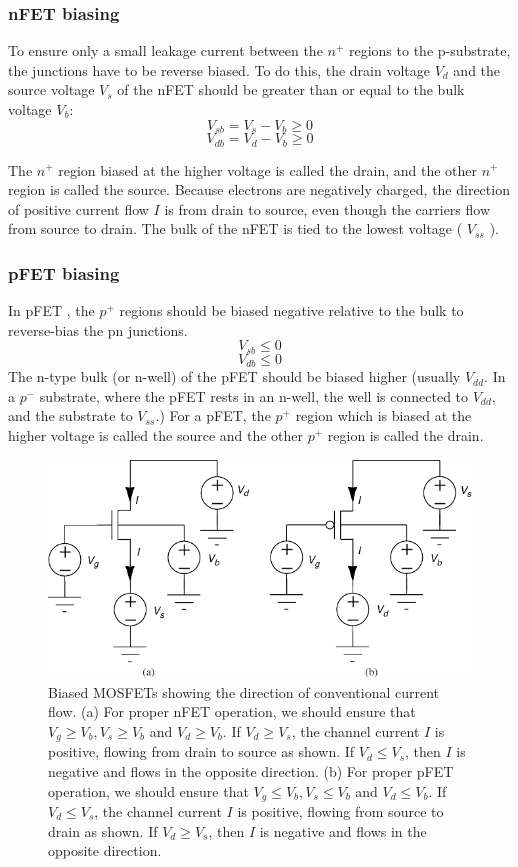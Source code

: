 \documentclass[main]{subfiles}
\begin{document}
\subsubsection{nFET biasing}
To ensure only a small leakage current between the $n^+$ regions to the p-substrate, the junctions have to be reverse biased.
To do this, the drain voltage $V_d$ and the source voltage $V_s$ of the nFET should be greater than or equal to the bulk voltage $V_b$:
\[V_{sb}=V_s-V_b \geq 0\]
\[V_{db}=V_d-V_b \geq 0\]


The $n^+$ region biased at the higher voltage is called the drain, and the other $n^+$ region is called the source. Because electrons are negatively charged, the direction of positive current flow $I$ is from drain to source, even though the carriers flow from source to drain. The bulk of the nFET is tied to the lowest voltage ( $V_{ss}$ ). \cite{book:VLSI}

\subsubsection{pFET biasing}
In pFET , the $p^+$ regions should be biased negative relative to the bulk to reverse-bias the pn junctions.
\[V_{sb} \leq 0\]
\[V_{db} \leq 0\]
The n-type bulk (or n-well) of the pFET should be biased higher (usually $V_{dd}$.  In a $p^-$ substrate, where the pFET rests in an n-well, the well is connected to $V_{dd}$, and the substrate to $V_{ss}$.) For a pFET, the $p^+$ region which is biased at the higher voltage is called the source and the other $p^+$ region is called the drain.

\begin{figure}[H]
\centering
\includegraphics[width=0.8\linewidth]{figs/nFET-pFET-operation.pdf}
\caption{Biased MOSFETs showing the direction of conventional current flow. (a) For proper nFET operation, we should ensure that $V_g \geq V_b, V_s \geq V_b $ and $V_d \geq V_b$. If $V_d \geq V_s$, the channel current $I$ is positive, flowing from drain to source as shown. If $V_d \leq V_s$, then $I$ is negative and flows in the opposite direction. (b) For proper pFET operation, we should ensure that $V_g \leq V_b, V_s \leq V_b $ and $V_d \leq V_b$. If $V_d \leq V_s$, the channel current $I$ is positive, flowing from source to drain as shown. If $V_d \geq V_s$, then $I$ is negative and flows in the opposite direction.}
\end{figure}
\end{document}
